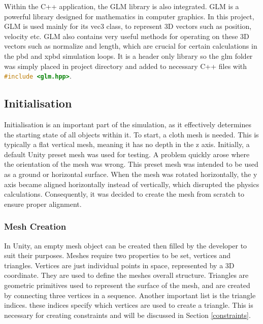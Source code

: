 \documentclass[12pt,a4paper]{article}
\begin{document}
Within the C++ application, the GLM library is also integrated. GLM is a powerful library designed for mathematics in computer graphics. In this project, GLM is used mainly for its vec3 class, to represent 3D vectors such as position, velocity etc. GLM also contains very useful methods for operating on these 3D vectors such as normalize and length, which are crucial for certain calculations in the pbd and xpbd simulation loops. It is a header only library so the glm folder was simply placed in project directory and added to necessary C++ files with \lstinline[language=C++]!#include <glm.hpp>!.
\subsection{Initialisation}
Initialisation is an important part of the simulation, as it effectively determines the starting state of all objects within it. To start, a cloth mesh is needed. This is typically a flat vertical mesh, meaning it has no depth in the z axis. Initially, a default Unity preset mesh was used for testing. A problem quickly arose where the orientation of the mesh was wrong. This preset mesh was intended to be used as a ground or horizontal surface. When the mesh was rotated horizontally, the y axis became aligned horizontally instead of vertically, which disrupted the physics calculations. Consequently, it was decided to create the mesh from scratch to ensure proper alignment.

\subsubsection{Mesh Creation}
\label{creation}
In Unity, an empty mesh object can be created then filled by the developer to suit their purposes. Meshes require two properties to be set, vertices and triangles. Vertices are just individual points in space, represented by a 3D coordinate. They are used to define the meshes overall structure. Triangles are geometric primitives used to represent the surface of the mesh, and are created by connecting three vertices in a sequence. Another important list is the triangle indices. these indices specify which vertices are used to create a triangle. This is necessary for creating constraints and will be discussed in Section \ref{constraints}. \\
\end{document}
